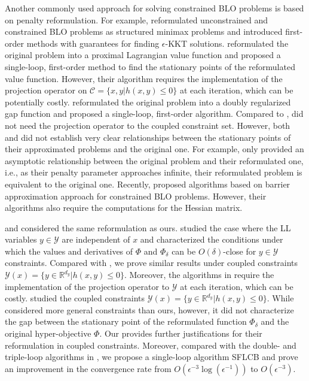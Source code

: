 \documentclass{article}
\newcommand{\Cc}{\mathcal{C}}
\newcommand{\Yc}{\mathcal{Y}}
\def\R{\mathbb{R}}
\theoremstyle{plain}
\theoremstyle{definition}
\theoremstyle{remark}
\begin{document}
Another commonly used approach for solving constrained BLO problems is based on penalty reformulation. For example, \cite{lu2024first} reformulated unconstrained and constrained BLO problems as structured minimax problems and introduced first-order methods with guarantees for finding $\epsilon$-KKT solutions.
\cite{yao2024constrained} reformulated the original problem into a proximal Lagrangian value function and proposed a single-loop, first-order method to find the stationary points of the reformulated value function. However, their algorithm requires the implementation of the projection operator on $\Cc=\{x,y|h(x,y)\leq 0\}$ at each iteration, which can be potentially costly. 
\cite{yao2024overcoming} reformulated the original problem into a doubly regularized gap function and proposed a single-loop, first-order algorithm. Compared to \cite{yao2024constrained},  \cite{yao2024overcoming} did not need
the projection operator to the coupled constraint set. However,
both \cite{yao2024constrained} and \cite{yao2024overcoming} did not establish very clear relationships between the stationary points of their approximated problems and the original one. For example,
\cite{yao2024overcoming} only provided an asymptotic relationship between the original problem and their reformulated one, i.e., as their penalty parameter approaches infinite, their reformulated problem is equivalent to the original one. Recently, \cite{tsaknakis2023implicit, jiang2024barrier} proposed algorithms based on barrier approximation approach for constrained BLO problems. However, their algorithms also require the computations for the Hessian matrix.



\cite{kwon2023penalty} and \cite{jiang2024primal} considered the same  reformulation as ours. \cite{kwon2023penalty} studied the case where the LL variables $y \in \Yc$ are independent of $x$ and characterized the conditions under which the values and derivatives of $\Phi$ and $\Phi_\delta$ can be $O(\delta)$-close for $y \in \Yc$ constraints. Compared with \cite{kwon2023penalty}, we prove similar results {under} coupled constraints $\Yc(x)=\{y\in \R^{d_y} | h(x,y)\leq 0\}$. Moreover, the algorithms in \cite{kwon2023penalty} require the implementation of the projection operator to $\Yc$ at each iteration, which can be costly. \cite{jiang2024primal} studied the coupled constraints $\Yc(x)=\{y\in \R^{d_y} | h(x,y)\leq 0\}$. While \cite{jiang2024primal} considered more general constraints than ours, however, it did not characterize the gap between the stationary point of the reformulated function $\Phi_\delta$ and the original hyper-objective $\Phi$. Our  provides further justifications for their reformulation in coupled constraints. Moreover, compared with the double- and triple-loop algorithms in \cite{kwon2023penalty}, we propose a single-loop algorithm SFLCB and prove an improvement in the convergence rate from $O(\epsilon^{-3}\log(\epsilon^{-1}))$ to $O(\epsilon^{-3})$. 
\end{document}
